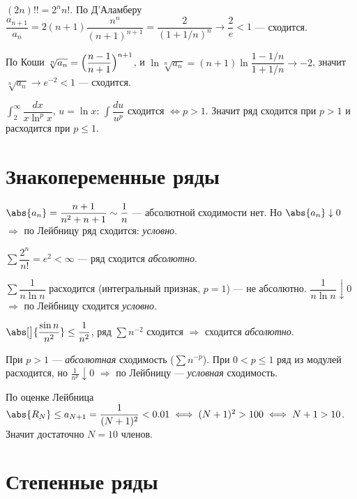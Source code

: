 \sol $(2n)!!=2^n n!$. По Д'Аламберу
$\dfrac{a_{n+1}}{a_n}=2(n+1)\dfrac{n^n}{(n+1)^{n+1}}=\dfrac{2}{(1+1/n)^n}\to\dfrac2e<1$ — сходится.

\sol По Коши $\sqrt[n]{a_n}=\Bigl(\dfrac{n-1}{n+1}\Bigr)^{n+1}$, и
$\ln\sqrt[n]{a_n}=(n+1)\ln\dfrac{1-1/n}{1+1/n}\to-2$, значит $\sqrt[n]{a_n}\to e^{-2}<1$ — сходится.

\sol $\int_2^\infty\dfrac{dx}{x\ln^p x}$, $u=\ln x$: $\int\dfrac{du}{u^p}$ сходится $\iff p>1$.
Значит ряд сходится при $p>1$ и расходится при $p\le1$.

\section{Знакопеременные ряды}

\sol $\abs{a_n}=\dfrac{n+1}{n^2+n+1}\sim\dfrac1n$ — абсолютной сходимости нет. Но $\abs{a_n}\downarrow0$
$\Rightarrow$ по Лейбницу ряд сходится: \emph{условно}.

\sol $\sum\dfrac{2^n}{n!}=e^2<\infty$ — ряд сходится \emph{абсолютно}.

\sol $\sum\dfrac1{n\ln n}$ расходится (интегральный признак, $p=1$) — не абсолютно. $\dfrac1{n\ln n}\downarrow0$
$\Rightarrow$ по Лейбницу сходится \emph{условно}.

\sol $\abs[\big]{\dfrac{\sin n}{n^2}}\le\dfrac1{n^2}$, ряд $\sum n^{-2}$ сходится $\Rightarrow$
сходится \emph{абсолютно}.

\sol При $p>1$ — \emph{абсолютная} сходимость ($\sum n^{-p}$). При $0<p\le1$ ряд из модулей
расходится, но $\tfrac1{n^p}\downarrow0$ $\Rightarrow$ по Лейбницу — \emph{условная} сходимость.

\sol По оценке Лейбница $\abs{R_N}\le a_{N+1}=\dfrac1{(N+1)^2}<0.01\iff(N+1)^2>100\iff N+1>10$.
Значит достаточно $N=10$ членов.

\section{Степенные ряды}


